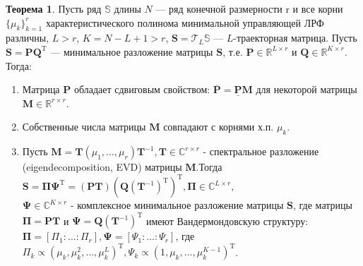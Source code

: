 \documentclass[specialist, substylefile = spbureport.rtx, subf,href,colorlinks=true, 12pt]{disser}
\theoremstyle{definition}
\newtheorem{theorem}{Теорема}
\begin{document}
\begin{theorem}
Пусть ряд $\mathbb{S}$ длины $N$ — ряд конечной размерности r и все
корни $\{ \mu_k\}_{k=1}^r$ характеристического полинома минимальной управляющей ЛРФ различны, $L > r$, $K = N - L + 1 > r$, $\mathbf{S} = \mathcal{T}_L\mathbb{S}$ — $L$-траекторная матрица. Пусть $\mathbf{S} = \mathbf{PQ}^{\mathrm{T}}$ — минимальное разложение матрицы $\mathbf{S}$, т.е. $\mathbf{P} \in \mathbb{R}^{L \times r}$ и $\mathbf{Q} \in \mathbb{R}^{K \times r}$. \\
    \hspace*{0.5cm} Тогда:
    \begin{enumerate}
        \item Матрица $\mathbf{P}$ обладает сдвиговым свойством: $\overline{\mathbf{P}} = \underline{\mathbf{P}}\mathbf{M}$ для некоторой матрицы $\mathbf{M} \in \mathbb{R}^{r \times r}$.
        \item Собственные числа матрицы $\mathbf{M}$ совпадают с корнями х.п. $\mu_k$.
        \item Пусть $\mathbf{M} = \mathbf{T}$$(\mu_1,\dots,\mu_r)\mathbf{T}^{-1}, \mathbf{T} \in \mathbb{C}^{r \times r}$ - спектральное разложение (eigen\-decomposition, EVD) матрицы $\mathbf{M}$.Тогда $\mathbf{S} = \mathbf{\Pi\Psi}^{\mathrm{T}} = (\mathbf{PT})(\mathbf{Q}(\mathbf{T}^{-1})^{\mathrm{T}})^{\mathrm{T}}, \mathbf{\Pi} \in \mathbb{C}^{L \times r}, $\\$\mathbf{\Psi} \in \mathbb{C}^{K \times r}$ - комплексное минимальное разложение матрицы $\mathbf{S}$, где матрицы $\mathbf{\Pi} = \mathbf{PT}$ и $\mathbf{\Psi} = \mathbf{Q}(\mathbf{T}^{-1})^{\mathrm{T}}$ имеют Вандермондовскую структуру: $\mathbf{\Pi} = [\Pi_1: \ldots :\Pi_r], \mathbf{\Psi} = [\Psi_1: \ldots :\Psi_r]$, где $\Pi_k \propto(\mu_k,\mu_k^2, \dots, \mu_k^L)^{\mathrm{T}}, \Psi_k \propto(1,\mu_k, \dots, \mu_k^{K - 1})^{\mathrm{T}}$.
    \end{enumerate}

\end{theorem}
\end{document}
